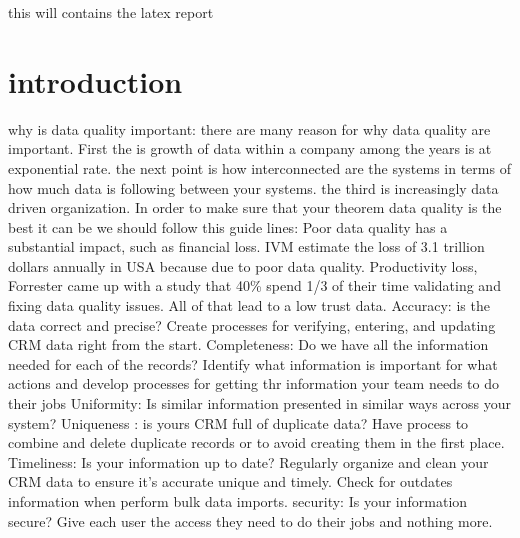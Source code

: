 this will contains the latex report

\section{introduction}
why is data quality important:
there are many reason for why data quality are important. First the is growth of data within a company among the years is at exponential rate. the next point is how interconnected are the systems in terms of how much data is following between your systems. the third is increasingly data driven organization.
In order to make sure that your theorem data quality is the best it can be we should follow this guide lines:
Poor data quality has a substantial impact, such as financial loss. IVM estimate the loss of 3.1 trillion dollars annually  in USA because due to poor data quality. Productivity loss, Forrester came up with a study that 40\% spend 1/3 of their time validating and fixing data quality issues. All of that lead to a low trust data.
Accuracy: is the data correct and precise? Create processes for verifying, entering, and updating CRM data right from the start.
Completeness: Do we have all the information needed for each of the records? Identify what information is important for what actions and develop processes for getting thr information your team needs to do their jobs
Uniformity: Is similar information presented in similar ways across your system?
Uniqueness : is yours CRM full of duplicate data? Have process to combine and delete duplicate records or to avoid creating them in the first place.
Timeliness: Is your information up to date? Regularly organize and clean your CRM data to ensure it's accurate unique and timely. Check for outdates information when perform bulk data imports.
security: Is your information secure? Give each user the access they need to do their jobs and nothing more.

